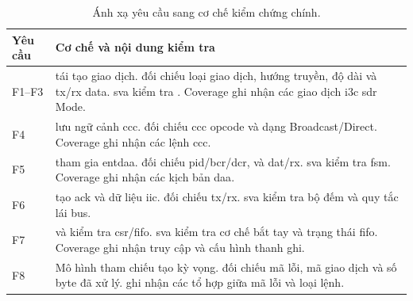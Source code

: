 \begin{table}[!htbp]
	\centering
	\caption{Ánh xạ yêu cầu sang cơ chế kiểm chứng chính.}
	\label{tab:req-ver-map}
	\begin{tabular}{C{2.0cm} L{10.5cm}}
		\toprule
		\textbf{Yêu cầu} & \textbf{Cơ chế và nội dung kiểm tra}                                                                                                                                                                                                                                                    \\
		\midrule
		F1--F3           & \IThreeCMonitor{} tái tạo giao dịch. \Scoreboard{} đối chiếu loại giao dịch, hướng truyền, độ dài và \gls{tx}/\gls{rx} data. \Gls{sva} kiểm tra \TBit{}. Coverage ghi nhận các giao dịch \gls{i3c} \gls{sdr} Mode.                                                                      \\
		F4               & \IThreeCDriver{} lưu ngữ cảnh \gls{ccc}. \Scoreboard{} đối chiếu \gls{ccc} opcode và dạng Broadcast/Direct. Coverage ghi nhận các lệnh \gls{ccc}.                                                                                                                                       \\
		F5               & \IThreeCAgent{} tham gia \gls{entdaa}. \Scoreboard{} đối chiếu \gls{pid}/\gls{bcr}/\gls{dcr}, \DynamicAddress{} và \gls{dat}/\gls{rx}. \Gls{sva} kiểm tra \gls{fsm}. Coverage ghi nhận các kịch bản \gls{daa}.                                                                          \\
		F6               & \IThreeCAgent{} tạo \gls{ack} và dữ liệu \gls{iic}. \Scoreboard{} đối chiếu \gls{tx}/\gls{rx}. \Gls{sva} kiểm tra bộ đếm và quy tắc lái bus.                                                                                                                                            \\
		F7               & \RegisterMonitor{} và \Scoreboard{} kiểm tra \gls{csr}/\gls{fifo}. \Gls{sva} kiểm tra cơ chế bắt tay và trạng thái \gls{fifo}. Coverage ghi nhận truy cập và cấu hình thanh ghi.                                                                                                        \\
		F8               & Mô hình tham chiếu tạo \ResponseDescriptor{} kỳ vọng. \Scoreboard{} đối chiếu mã lỗi, mã giao dịch và số byte đã xử lý. \CorrelatedCoverage{} ghi nhận các tổ hợp giữa mã lỗi và loại lệnh.                                                                                             \\

\end{tabular}
\end{table}
